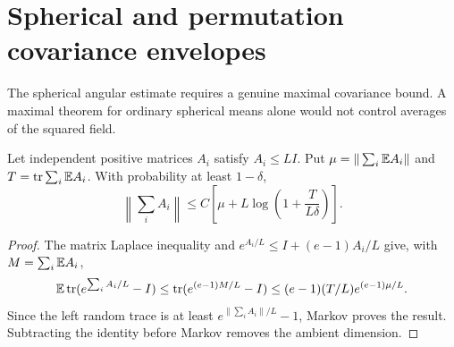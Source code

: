 \section{Spherical and permutation covariance envelopes}
\label{sec:angular-envelopes}
The spherical angular estimate requires a genuine maximal covariance
bound. A maximal theorem for ordinary spherical means alone would not
control averages of the squared field.

\begin{lemma}\label{lem:intrinsic-psd}
Let independent positive matrices $A_i$ satisfy $A_i\le LI$. Put
$\mu=\|\sum_i\mathbb E A_i\|$ and $T=\operatorname{tr}\sum_i\mathbb E A_i$.
With probability at least $1-\delta$,
\[
 \left\|\sum_iA_i\right\|
 \le C\left[\mu+L\log\left(1+\frac{T}{L\delta}\right)\right].
\]
\end{lemma}
\begin{proof}
The matrix Laplace inequality and
$e^{A_i/L}\le I+(e-1)A_i/L$ give, with $M=\sum_i\mathbb E A_i$,
\[
 \mathbb E\operatorname{tr}(e^{\sum_iA_i/L}-I)
 \le\operatorname{tr}(e^{(e-1)M/L}-I)
 \le(e-1)(T/L)e^{(e-1)\mu/L}.
\]
Since the left random trace is at least
$e^{\|\sum_iA_i\|/L}-1$, Markov proves the result. Subtracting the
identity before Markov removes the ambient dimension.
\end{proof}

